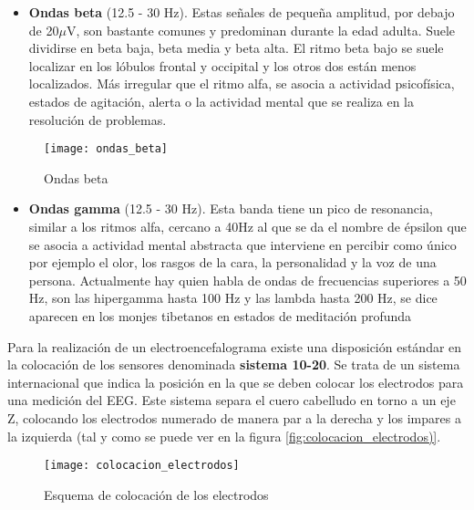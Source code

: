 \begin{itemize}
\item\textbf{Ondas beta} (12.5 - 30 Hz). Estas señales de pequeña amplitud, por debajo de 20$\mu$V, son bastante comunes y predominan durante la edad adulta. Suele dividirse en beta baja, beta media y beta alta. El ritmo beta bajo se suele localizar en los lóbulos frontal y occipital y los otros dos están menos localizados. Más irregular que el ritmo alfa, se asocia a actividad psicofísica, estados de agitación, alerta o la actividad mental que se realiza en la resolución de problemas.
\end{itemize}
\begin{figure} [H]
    \centering
    \texttt{[image: ondas\_beta]}
    \caption{Ondas beta \cite{apuntes}}
    \label{fig:ondas_beta}
\end{figure}

\begin{itemize}
\item\textbf{Ondas gamma} (12.5 - 30 Hz). Esta banda tiene un pico de resonancia, similar a los ritmos alfa, cercano a 40Hz al que se da el nombre de épsilon que se asocia a actividad mental abstracta que interviene en percibir como único por ejemplo el olor, los rasgos de la cara, la personalidad y la voz de una persona. Actualmente hay quien habla de ondas de frecuencias superiores a 50 Hz, son las hipergamma hasta 100 Hz y las lambda hasta 200 Hz, se dice aparecen en los monjes tibetanos en estados de meditación profunda
\end{itemize}

Para la realización de un electroencefalograma existe una disposición estándar en la colocación de los sensores denominada \textbf{sistema 10-20}. Se trata de un sistema internacional que indica la posición en la que se deben colocar los electrodos para una medición del EEG.  Este sistema separa el cuero cabelludo en torno a un eje Z, colocando los electrodos numerado de manera par a la derecha y los impares a la izquierda (tal y como se puede ver en la figura \ref{fig:colocacion_electrodos)}.

\begin{figure} [H]
    \centering
    \texttt{[image: colocacion\_electrodos]}
    \caption{Esquema de colocación de los electrodos}
    \label{fig:colocacion_electrodos}
\end{figure}

